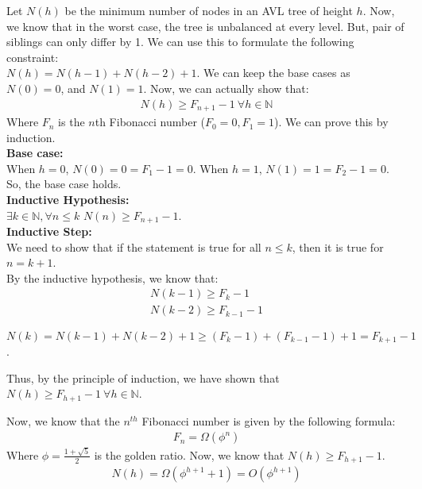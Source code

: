 \documentclass[a4paper]{article}
\begin{document}
\begin{enumerate}
    Let $N(h)$ be the minimum number of nodes in an AVL tree of height $h$. Now, we know that in the worst case, the tree is unbalanced at every level. But, pair of siblings can only differ by 1. We can use this to formulate the following constraint:\\

    $N(h) = N(h-1) + N(h-2) + 1$. We can keep the base cases as $N(0) = 0$, and $N(1) = 1$. Now, we can actually show that:
    \begin{align*}
        N(h) \geq F_{n+1} - 1\ \forall h \in \mathbb{N}
    \end{align*}
    Where $F_n$ is the $n$th Fibonacci number ($F_0 = 0, F_1 = 1$). We can prove this by induction.\\

    \textbf{Base case:}\\
    When $h = 0$, $N(0) = 0 = F_1 - 1 = 0$. When $h = 1$, $N(1) = 1 = F_2 - 1 = 0$. So, the base case holds.\\

    \textbf{Inductive Hypothesis:}\\
    $\exists k \in \mathbb{N}, \forall n \leq k$ $N(n) \geq F_{n+1} - 1$.\\

    \textbf{Inductive Step:}\\
    We need to show that if the statement is true for all $n \leq k$, then it is true for $n = k+1$.\\

    By the inductive hypothesis, we know that:\\
    \begin{align*}
        N(k-1) \geq F_{k} - 1 \\
        N(k-2) \geq F_{k-1} - 1
    \end{align*}

    $N(k) = N(k-1) + N(k-2) + 1 \geq (F_{k} - 1) + (F_{k-1} - 1) + 1 = F_{k+1} - 1$.
    
    Thus, by the principle of induction, we have shown that $N(h) \geq F_{h+1} - 1\ \forall h \in \mathbb{N}$.
   
    
    Now, we know that the $n^{th}$ Fibonacci number is given by the following formula:
    \begin{align*}
        F_n = \Omega(\phi^n)
    \end{align*}
    Where $\phi = \frac{1+\sqrt{5}}{2}$ is the golden ratio. Now, we know that $N(h) \geq F_{h+1} - 1$.
    \begin{align*}
        N(h) = \Omega(\phi^{h+1} + 1) = O(\phi^{h+1})
    \end{align*}


\end{enumerate}
\end{document}
